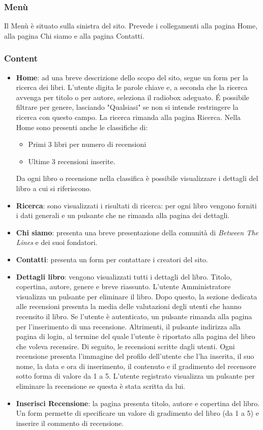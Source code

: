 \documentclass[12pt,a4paper,headings=optiontohead]{article}
\begin{document}
	
	\subsubsection{Menù}
	
	Il Menù è situato sulla sinistra del sito. Prevede i collegamenti alla pagina Home, alla pagina Chi siamo e alla pagina Contatti.
	
	\subsubsection{Content}
	
	\begin{itemize}
		\item \textbf{Home}: ad una breve descrizione dello scopo del sito, segue un form per la ricerca dei libri. L'utente digita le parole chiave e, a seconda che la ricerca avvenga per titolo o per autore, seleziona il radiobox adeguato. \'E possibile filtrare per genere, lasciando "Qualsiasi" se non si intende restringere la ricerca con questo campo. La ricerca rimanda alla pagina Ricerca. Nella Home sono presenti anche le classifiche di:
		\begin{itemize}
			\item Primi 3 libri per numero di recensioni
			\item Ultime 3 recensioni inserite.
		\end{itemize} 
		Da ogni libro o recensione nella classifica è possibile visualizzare i dettagli del libro a cui si riferiscono.
		\item \textbf{Ricerca}: sono visualizzati i risultati di ricerca: per ogni libro vengono forniti i dati generali e un pulsante che ne rimanda alla pagina dei dettagli.
		\item \textbf{Chi siamo}: presenta una breve presentazione della comunità di \textit{Between The Lines} e dei suoi fondatori.
		\item \textbf{Contatti}: presenta un form per contattare i creatori del sito.
		\item \textbf{Dettagli libro}: vengono visualizzati tutti i dettagli del libro. Titolo, copertina, autore, genere e breve riassunto. L'utente Amministratore visualizza un pulsante per eliminare il libro. Dopo questo, la sezione dedicata alle recensioni presenta la media delle valutazioni degli utenti che hanno recensito il libro. Se l'utente è autenticato, un pulsante rimanda alla pagina per l'inserimento di una recensione. Altrimenti, il pulsante indirizza alla pagina di login, al termine del quale l'utente è riportato alla pagina del libro che voleva recensire. Di seguito, le recensioni scritte dagli utenti. Ogni recensione presenta l'immagine del profilo dell'utente che l'ha inserita, il suo nome, la data e ora di inserimento, il contenuto e il gradimento del recensore sotto forma di valore da 1 a 5. L'utente registrato visualizza un pulsante per eliminare la recensione se questa è stata scritta da lui.
		\item \textbf{Inserisci Recensione}: la pagina presenta titolo, autore e copertina del libro. Un form permette di specificare un valore di gradimento del libro (da 1 a 5) e inserire il commento di recensione.
	\end{itemize}
	
\end{document}
